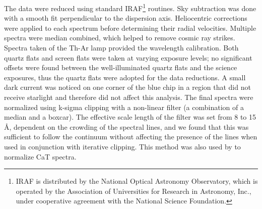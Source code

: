 \documentclass{emulateapj}
\begin{document}
The data were reduced using standard IRAF\footnote{IRAF is 
distributed by the National Optical Astronomy Observatory, 
which is operated by the Association of Universities for Research in 
Astronomy, Inc., under cooperative agreement with the National Science 
Foundation.} routines.   
Sky subtraction was done with a smooth fit perpendicular to the dispersion 
axis.    Heliocentric corrections were applied to each spectrum before
determining their radial velocities.
Multiple spectra were median combined, which helped to remove
cosmic ray strikes.
Spectra taken of the Th-Ar lamp provided the wavelength
calibration.   Both quartz flats and screen flats were taken at varying
exposure levels; no significant offsets were found between the 
well-illuminated quartz flats and the science exposures, thus 
the quartz flats were adopted for the data reductions.   
A small dark current was noticed
on one corner of the blue chip in a region that did not receive 
starlight and therefore did not affect this analysis.
The final spectra were normalized using k-sigma clipping with a non-linear
filter (a combination of a median and a boxcar).   The effective scale
length of the filter was set from 8 to 15 \AA, dependent on the crowding 
of the spectral lines, and we found that this was sufficient to follow the 
continuum without affecting the presence of the lines when used in 
conjunction with iterative clipping.
%
This method was also used by \citet{Bat08} to normalize CaT
spectra.   
\end{document}
